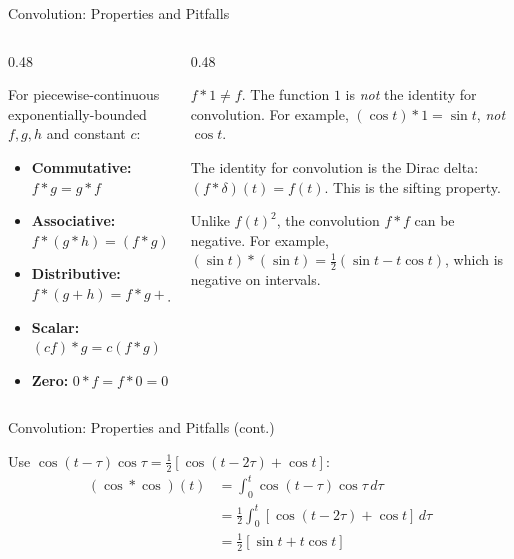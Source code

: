 \documentclass[aspectratio=169,11pt]{beamer}
\begin{document}
\begin{frame}{Convolution: Properties and Pitfalls}
\footnotesize
\begin{columns}[T]
\begin{column}{0.48\textwidth}
\begin{methodbox}
For piecewise-continuous exponentially-bounded $f, g, h$ and constant $c$:
\begin{itemize}
\item \textbf{Commutative:} $f * g = g * f$
\item \textbf{Associative:} $f * (g * h) = (f * g) * h$
\item \textbf{Distributive:} $f * (g + h) = f * g + f * h$
\item \textbf{Scalar:} $(cf) * g = c(f * g)$
\item \textbf{Zero:} $0 * f = f * 0 = 0$
\end{itemize}
\end{methodbox}
\end{column}
\begin{column}{0.48\textwidth}
\begin{warningbox}
$f * 1 \ne f$. The function $1$ is \emph{not} the identity for convolution. For example, $(\cos t) * 1 = \sin t$, \emph{not} $\cos t$.

\medskip
The identity for convolution is the Dirac delta: $(f * \delta)(t) = f(t)$. This is the sifting property.
\end{warningbox}
\vspace{0.5mm}
\begin{warningbox}
Unlike $f(t)^2$, the convolution $f * f$ can be negative. For example, $(\sin t) * (\sin t) = \tfrac{1}{2}(\sin t - t\cos t)$, which is negative on intervals.
\end{warningbox}
\end{column}
\end{columns}
\end{frame}

\begin{frame}{Convolution: Properties and Pitfalls (cont.)}
\footnotesize
\begin{examplebox}
Use $\cos(t-\tau)\cos\tau = \tfrac{1}{2}[\cos(t-2\tau) + \cos t]$:
\[\begin{aligned}
(\cos * \cos)(t) &= \int_0^t \cos(t-\tau)\cos\tau\,d\tau \\
&= \tfrac{1}{2}\int_0^t [\cos(t-2\tau)+\cos t]\,d\tau \\
&= \tfrac{1}{2}[\sin t + t\cos t]
\end{aligned}\]
\end{examplebox}
\end{frame}
\end{document}
